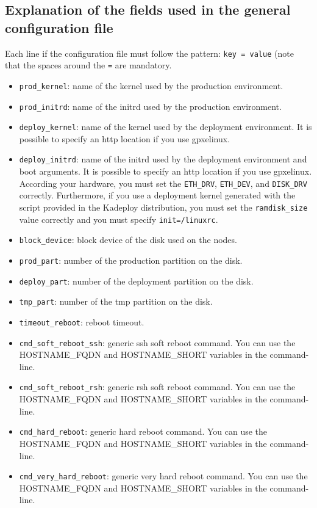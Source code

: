 \documentclass[a4wide,10pt,oneside]{book}
\begin{document}
\subsection{Explanation of the fields used in the general configuration file}
Each line if the configuration file must follow the pattern: \texttt{key = value} (note that the spaces around the \texttt{=} are mandatory.
\begin{itemize}
\item \texttt{prod\_kernel}: name of the kernel used by the production environment.
\item \texttt{prod\_initrd}: name of the initrd used by the production environment.
\item \texttt{deploy\_kernel}: name of the kernel used by the deployment environment. It is possible to specify an http location if you use gpxelinux.
\item \texttt{deploy\_initrd}: name of the initrd used by the deployment environment and boot arguments. It is possible to specify an http location if you use gpxelinux. According your hardware, you must set the \texttt{ETH\_DRV}, \texttt{ETH\_DEV}, and \texttt{DISK\_DRV} correctly. Furthermore, if you use a deployment kernel generated with the script provided in the Kadeploy distribution, you must set the \texttt{ramdisk\_size} value correctly and you must specify \texttt{init=/linuxrc}.
\item \texttt{block\_device}: block device of the disk used on the nodes.
\item \texttt{prod\_part}: number of the production partition on the disk.
\item \texttt{deploy\_part}: number of the deployment partition on the disk.
\item \texttt{tmp\_part}: number of the tmp partition on the disk.
\item \texttt{timeout\_reboot}: reboot timeout.
\item \texttt{cmd\_soft\_reboot\_ssh}: generic ssh soft reboot command. You can use the HOSTNAME\_FQDN and HOSTNAME\_SHORT variables in the command-line.
\item \texttt{cmd\_soft\_reboot\_rsh}: generic rsh soft reboot command. You can use the HOSTNAME\_FQDN and HOSTNAME\_SHORT variables in the command-line.
\item \texttt{cmd\_hard\_reboot}: generic hard reboot command. You can use the HOSTNAME\_FQDN and HOSTNAME\_SHORT variables in the command-line.
\item \texttt{cmd\_very\_hard\_reboot}: generic very hard reboot command. You can use the HOSTNAME\_FQDN and HOSTNAME\_SHORT variables in the command-line.

\end{itemize}
\end{document}
